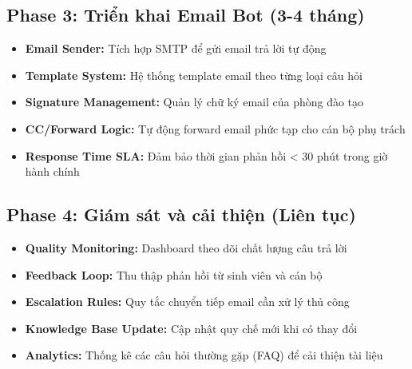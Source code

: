 \documentclass[../DoAn.tex]{subfiles}
\begin{document}
\subsection{Phase 3: Triển khai Email Bot (3-4 tháng)}
\begin{itemize}
    \item \textbf{Email Sender:} Tích hợp SMTP để gửi email trả lời tự động
    \item \textbf{Template System:} Hệ thống template email theo từng loại câu hỏi
    \item \textbf{Signature Management:} Quản lý chữ ký email của phòng đào tạo
    \item \textbf{CC/Forward Logic:} Tự động forward email phức tạp cho cán bộ phụ trách
    \item \textbf{Response Time SLA:} Đảm bảo thời gian phản hồi < 30 phút trong giờ hành chính
\end{itemize}

\subsection{Phase 4: Giám sát và cải thiện (Liên tục)}
\begin{itemize}
    \item \textbf{Quality Monitoring:} Dashboard theo dõi chất lượng câu trả lời
    \item \textbf{Feedback Loop:} Thu thập phản hồi từ sinh viên và cán bộ
    \item \textbf{Escalation Rules:} Quy tắc chuyển tiếp email cần xử lý thủ công
    \item \textbf{Knowledge Base Update:} Cập nhật quy chế mới khi có thay đổi
    \item \textbf{Analytics:} Thống kê các câu hỏi thường gặp (FAQ) để cải thiện tài liệu
\end{itemize}
\end{document}
